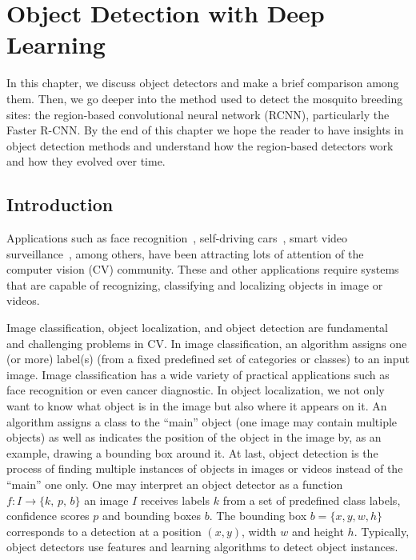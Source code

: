 \chapter{Object Detection with Deep Learning}
\label{chap:system}
%
In this chapter, we discuss object detectors and make a brief comparison among them.
Then, we go deeper into the method used to detect the mosquito breeding sites: the region-based convolutional neural network (RCNN),
particularly the Faster R-CNN.
By the end of this chapter we hope the reader to have insights in object detection methods and understand how the region-based detectors work and how they evolved over time.

\section{Introduction}
Applications such as face recognition~\cite{taigman2014, schroff2015facenet, Passos2018face}, self-driving cars~\cite{Chen2015drive}, smart video surveillance~\cite{Afonso2018vdao}, among others, have been attracting lots of attention of the computer vision (CV) community.
These and other applications require systems that are capable of recognizing, classifying and localizing objects in image or videos.

Image classification, object localization, and object detection are fundamental and challenging problems
in CV.
%
In image classification, an algorithm assigns one (or more) label(s) (from a fixed predefined set of categories or classes) to an input image.
Image classification has a wide variety of practical applications such as face recognition or even cancer diagnostic.
%
In object localization, we not only want to know what object is in the image but also where it appears on it.
An algorithm assigns a class to the ``main'' object (one image may contain multiple objects) as well as indicates the position of the object in the image by, as an example, drawing a bounding box around it.
%
At last, object detection is the process of finding multiple instances of objects in images or videos instead of the ``main'' one only.
One may interpret an object detector as a function $f: I\rightarrow\{k,\, p,\, b\}$ \ie an image $I$ receives labels $k$ from a set of predefined class labels, confidence scores $p$ and bounding boxes $b$.
The bounding box $b = \{x, y, w, h\}$ corresponds to a detection at a position $(x,y)$, width $w$ and height $h$.
Typically, object detectors use features and learning algorithms to detect object instances.

